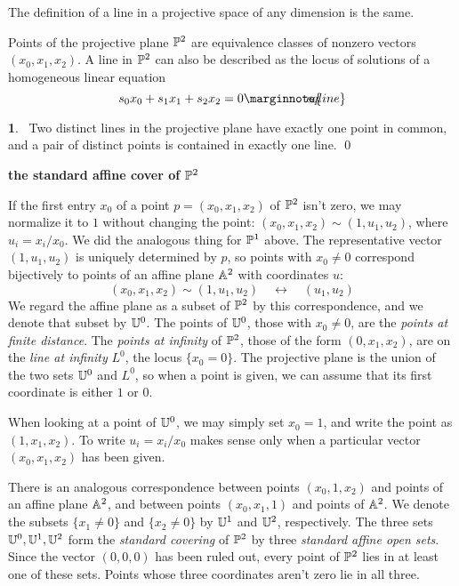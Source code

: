 \documentclass[leqno]{book}
\newcommand\Marginnote[1]{\marginnote{\hspace{-12pt}\normalfont{#1}}}
\renewcommand\theequation{\thesection.\arabic{equation}}
\newenvironment{boldequation}{\renewcommand\theequation{\textbf{\thesection.\arabic{equation}}}\equation}
   {\endequation}
\theoremstyle{definition}%
\numberwithin{equation}{section}
\theoremstyle{theorem} %
\newtheorem{lemma}[equation]{}
\begin{document}
\no
The definition of a line in a projective space of any dimension is the same.

Points of the projective plane $\mathbb{P}^2$ are equivalence classes of
nonzero vectors $(x_0,x_1,x_2)$.
 A line in $\mathbb{P}^2$ can also be described as
the locus of solutions of a homogeneous
linear equation
\begin{equation}	
s_0x_0+s_1x_1+s_2x_2 =0 \Marginnote{eqline}
	\label{eqline}
\end{equation}





 \begin{lemma}{} \Marginnote{linesmeet}\;\,
Two distinct lines in the projective plane 
have exactly one point in common, and a pair of distinct points is
contained in exactly one line.  \qed 
\label{linesmeet} \end{lemma}


\begin{boldequation}
 \hspace{-8cm} \textbf{the standard affine cover of $\mathbb{P}^2$}
\label{standcov} \Marginnote{standcov}
\end{boldequation}

 
\msno If the first entry $x_0$ of a point $p = (x_0,x_1,x_2)$ of
$\mathbb{P}^2$ isn't zero, we may normalize it to $1$ without changing the
point: $(x_0,x_1,x_2) \sim (1,u_1,u_2)$, where $u_i =x_i/x_0$.  We did
the analogous thing for $\mathbb{P}^1$ above.  The representative vector
$(1,u_1,u_2)$ is uniquely determined by $p$, so points with $x_0\neq
0$ correspond bijectively to points of an affine plane $\mathbb{A}^2$ with
coordinates $u$:
$$(x_0,x_1,x_2) \sim (1,u_1,u_2) \quad \longleftrightarrow \quad
(u_1,u_2)$$ We regard the affine plane as a subset of $\mathbb{P}^2$ by this
correspondence, and we denote that subset by $\mathbb{U}^0$.  The points of
$\mathbb{U}^0$, those with $x_0\neq 0$, are the {\it points at finite
  distance}.  The {\it points at infinity} of $\mathbb{P}^2$, those of the
form $(0,x_1,x_2)$, are on the {\it line at infinity} $L^0$, the locus
$\{x_0=0\}$. The projective plane is the union of the two sets
$\mathbb{U}^0$ and $L^0$, so when a point is given, we can assume that
its first coordinate is either $1$ or $0$.

When looking at a point of $\mathbb{U}^0$, we may simply set $x_0=1$,
and write the point as $(1,x_1,x_2)$.  To write $u_i = x_i/x_0$ makes sense
only when a particular  vector $(x_0,x_1,x_2)$ has 
been given.

There is an analogous correspondence between points $(x_0,1,x_2)$
and points of an affine plane $\mathbb{A}^2$, and between points
$(x_0,x_1,1)$ and points of $\mathbb{A}^2$.  We denote the subsets
$\{x_1\neq 0\}$ and $\{x_2\neq 0\}$ by $\mathbb{U}^1$ and $\mathbb{U}^2$,
respectively.  The three sets $\mathbb{U}^0,\mathbb{U}^1,\mathbb{U}^2$ form the {\it
  standard covering} of $\mathbb{P}^2$ by three {\it standard affine open
  sets}.  Since the vector $(0,0,0)$ has been ruled out, every point
of $\mathbb{P}^2$ lies in at least one of these sets.  Points whose three
coordinates aren't zero lie in all three.
\end{document}
